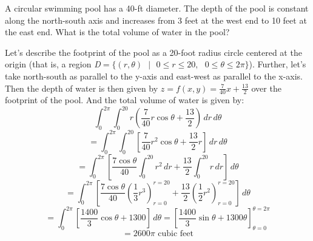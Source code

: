 \begin{Exercise}[title = {The volume of a pool}, label = polarmulti2]
A circular swimming pool has a 40-ft diameter. The depth of the pool is 
constant along the north-south axis and increases from 3 feet at the west end 
to 10 feet at the east end. What is the total volume of water in the pool? 
\vspace{50mm}
\end{Exercise}

\begin{Answer}[ref = polarmulti2]
Let's describe the footprint of the pool as a 20-foot radius circle centered 
at the origin (that is, a region \textit{D}$ = \{(r, \theta)\text{ }|\text{ }0 
\leq r \leq 20,\text{ }0 \leq \theta \leq 2\pi\}$). Further, let's take 
north-south as parallel to the y-axis and east-west as parallel to the x-axis. 
Then the depth of water is then given by $z = f(x, y) = \frac{7}{40}x + \frac{
13}{2}$ over the footprint of the pool. And the total volume of water is given 
by:
$$\int_0^{2\pi} \int_0^{20} r \left( \frac{7}{40}r\cos{\theta} + \frac{13}{2} 
\right)\,dr\,d\theta$$
$$= \int_0^{2\pi} \int_0^{20} \left[ \frac{7}{40}r^2\cos{\theta} + \frac{13}{2}
r \right] \,dr\,d\theta$$
$$= \int_0^{2\pi} \left[ \frac{7\cos{\theta}}{40}\int_0^{20} r^2\,dr + \frac{13
}{2} \int_0^{20} r\,dr \right]\,d\theta$$
$$= \int_0^{2\pi} \left[ \frac{7\cos{\theta}}{40} \left( \frac{1}{3}r^3 \right)
_{r = 0}^{r = 20} + \frac{13}{2} \left( \frac{1}{2}r^2 \right)_{r = 0}^{r = 20}
\right]\,d\theta$$
$$= \int_0^{2\pi} \left[ \frac{1400}{3}\cos{\theta} + 1300 \right]\,d\theta = 
\left[ \frac{1400}{3}\sin{\theta} + 1300\theta \right]_{\theta = 0}^{\theta = 
2\pi}$$
$$= 2600\pi \text{ cubic feet}$$    
\end{Answer}
